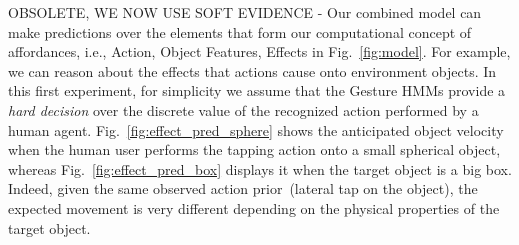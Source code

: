 OBSOLETE, WE NOW USE SOFT EVIDENCE - Our combined model can make predictions over the elements that form our computational concept of affordances, i.e., Action, Object Features, Effects in Fig.~\ref{fig:model}.
For example, we can reason about the effects that actions cause onto environment objects.
In this first experiment, for simplicity we assume that the Gesture \acp{HMM} provide a \emph{hard decision} over the discrete value of the recognized action performed by a human agent.
Fig.~\ref{fig:effect_pred_sphere} shows the anticipated object velocity when the human user performs the tapping action onto a small spherical object, whereas Fig.~\ref{fig:effect_pred_box} displays it when the target object is a big box. Indeed, given the same observed action prior~(lateral tap on the object), the expected movement is very different depending on the physical properties of the target object.

\begin{figure*}
    \centering


    \caption{Object velocity predictions on a small sphere, given probabilistic human action information from Gesture \acp{HMM}.}
    \label{fig:effect_pred_sphere}
\end{figure*}

